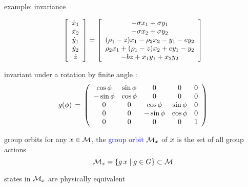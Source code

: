 \begin{frame}{example:  invariance}
			\begin{exampleblock}{{\cLe}}
\scriptsize		
\[
		\left[
					\begin{array}{c}
				\dot{x}_1 \\ \dot{x}_2 \\ \dot{y}_1 \\ \dot{y}_2 \\ \dot{z}
				\end{array}
		\right]
=
		\left[
					\begin{array}{c}
				 -\sigma x_1 + \sigma y_1 \\
				-\sigma x_2 + \sigma y_2 \\
                (\RerCLor-z) x_1 - \ImrCLor x_2 -y_1-e y_2 \\
                \ImrCLor x_1 + (\RerCLor-z) x_2 + e y_1- y_2 \\
				-b z + x_1 y_1 + x_2 y_2
				\end{array}
		\right]
\]
			\end{exampleblock}

\begin{block}{}
invariant under a  rotation by finite angle
\gSpace:
\scriptsize		
\[
\LieEl(\gSpace) \,=\,  \left(\barr{ccccc}
  \cos \gSpace  & \sin \gSpace  & 0 & 0 & 0 \\
 -\sin \gSpace  & \cos \gSpace  & 0 & 0 & 0 \\
 0 & 0 &  \cos \gSpace & \sin \gSpace   & 0 \\
 0 & 0 & -\sin \gSpace & \cos \gSpace   & 0 \\
 0 & 0 & 0             & 0              & 1
    \earr\right)
\] %
\end{block}
\end{frame}

\begin{frame}{group orbits}
for any $\ssp \in \pS$, the
\textcolor{blue}{group orbit} $\pS_\ssp $ of $\ssp$ is the set of all group
actions
\[
\pS_\ssp = \{g\,\ssp \mid g \in {\Group}\} \subset \pS
\]

\bigskip\bigskip
states in $\pS_\ssp $ are physically equivalent
\end{frame}

